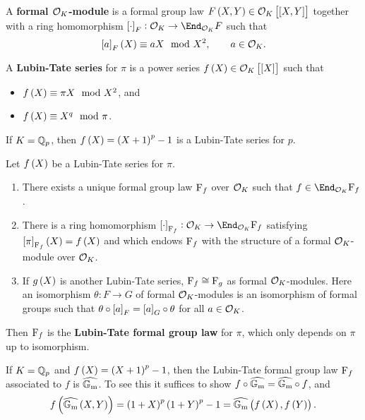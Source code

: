 \begin{definition}
A \textbf{formal $ \mathcal{O}_K $-module} is a formal group law $ F\br{X, Y} \in \OOO_K\sbr{\sbr{X, Y}} $ together with a ring homomorphism $ \sbr{\cdot}_F : \OOO_K \to \End_{\OOO_K} F $ such that
$$ \sbr{a}_F\br{X} \equiv aX \mod X^2, \qquad a \in \OOO_K. $$
\end{definition}

\begin{definition}
A \textbf{Lubin-Tate series} for $ \pi $ is a power series $ f\br{X} \in \OOO_K\sbr{\sbr{X}} $ such that
\begin{itemize}
\item $ f\br{X} \equiv \pi X \mod X^2 $, and
\item $ f\br{X} \equiv X^q \mod \pi $.
\end{itemize}
\end{definition}

\begin{example*}
If $ K = \mathbb{Q}_p $, then $ f\br{X} = \br{X + 1}^p - 1 $ is a Lubin-Tate series for $ p $.
\end{example*}

\begin{theorem}
\label{thm:20.7}
Let $ f\br{X} $ be a Lubin-Tate series for $ \pi $.
\begin{enumerate}
\item There exists a unique formal group law $ \mathrm{F}_f $ over $ \mathcal{O}_K $ such that $ f \in \End_{\OOO_K} \F_f $.
\item There is a ring homomorphism $ \sbr{\cdot}_{\F_f} : \OOO_K \to \End_{\OOO_K} \F_f $ satisfying $ \sbr{\pi}_{\F_f}\br{X} = f\br{X} $ and which endows $ \mathrm{F}_f $ with the structure of a formal $ \mathcal{O}_K $-module over $ \mathcal{O}_K $.
\item If $ g\br{X} $ is another Lubin-Tate series, $ \mathrm{F}_f \cong \mathrm{F}_g $ as formal $ \mathcal{O}_K $-modules. Here an isomorphism $ \theta : F \to G $ of formal $ \mathcal{O}_K $-modules is an isomorphism of formal groups such that $ \theta \circ \sbr{a}_F = \sbr{a}_G \circ \theta $ for all $ a \in \mathcal{O}_K $.
\end{enumerate}
\end{theorem}

Then $ \mathrm{F}_f $ is the \textbf{Lubin-Tate formal group law} for $ \pi $, which only depends on $ \pi $ up to isomorphism.

\begin{example*}
If $ K = \mathbb{Q}_p $ and $ f\br{X} = \br{X + 1}^p - 1 $, then the Lubin-Tate formal group law $ \mathrm{F}_f $ associated to $ f $ is $ \widehat{\mathbb{G}_{\mathrm{m}}} $. To see this it suffices to show $ f \circ \widehat{\mathbb{G}_{\mathrm{m}}} = \widehat{\mathbb{G}_{\mathrm{m}}} \circ f $, and
$$ f\br{\widehat{\GG_\m}\br{X, Y}} = \br{1 + X}^p\br{1 + Y}^p - 1 = \widehat{\GG_\m}\br{f\br{X}, f\br{Y}}. $$
\end{example*}

